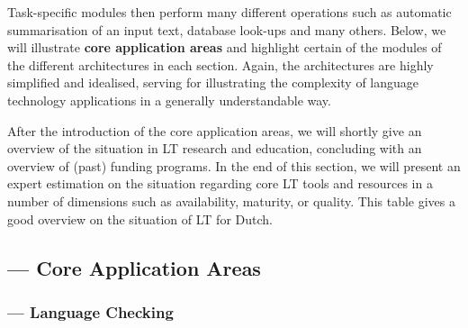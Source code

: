 \documentclass{scrartcl}
\begin{document}
\begin{Parallel}[c]{70mm}{70mm}
{    Task-specific modules then perform many different operations such as automatic summarisation of an input text, database look-ups and many others. Below, we will illustrate \textbf{core application areas} and highlight certain of the modules of the different architectures in each section. Again, the architectures are highly simplified and idealised, serving for illustrating the complexity of language technology applications in a generally understandable way.

    After the introduction of the core application areas, we will shortly give an overview of the situation in LT research and education, concluding with an overview of (past) funding programs. In the end of this section, we will present an expert estimation on the situation regarding core LT tools and resources in a number of dimensions such as availability, maturity, or quality. This table gives a good overview on the situation of LT for Dutch.

  }
  \ParallelPar


  \subsection{ --- Core Application Areas}




  \subsubsection{ --- Language Checking}

  \MyParallelLText{


  }

\end{Parallel}
\end{document}
